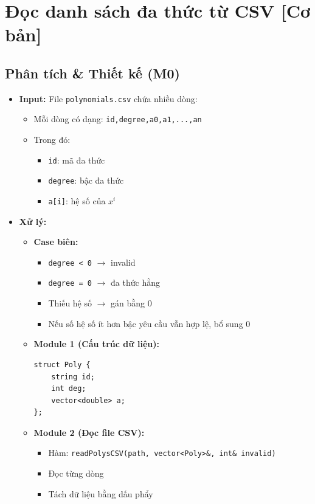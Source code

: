 \section{Đọc danh sách đa thức từ CSV [Cơ bản]}
\subsection{Phân tích \& Thiết kế (M0)}
\begin{itemize}
    \item \textbf{Input:}
    File \texttt{polynomials.csv} chứa nhiều dòng:
    \begin{itemize}
        \item Mỗi dòng có dạng:
        \texttt{id,degree,a0,a1,...,an}
        \item Trong đó:
        \begin{itemize}
            \item \texttt{id}: mã đa thức
            \item \texttt{degree}: bậc đa thức
            \item \texttt{a[i]}: hệ số của \(x^i\)
        \end{itemize}
    \end{itemize}

    \item \textbf{Xử lý:}
    \begin{itemize}
        \item \textbf{Case biên:}
        \begin{itemize}
            \item \texttt{degree < 0} $\rightarrow$ invalid
            \item \texttt{degree = 0} $\rightarrow$ đa thức hằng
            \item Thiếu hệ số $\rightarrow$ gán bằng 0
            \item Nếu số hệ số ít hơn bậc yêu cầu vẫn hợp lệ, bổ sung 0
        \end{itemize}

        \item \textbf{Module 1 (Cấu trúc dữ liệu):}
\begin{lstlisting}
struct Poly {
    string id;
    int deg;
    vector<double> a;
};
\end{lstlisting}

        \item \textbf{Module 2 (Đọc file CSV):}
        \begin{itemize}
            \item Hàm:
            \texttt{readPolysCSV(path, vector<Poly>\&, int\& invalid)}
            \item Đọc từng dòng
            \item Tách dữ liệu bằng dấu phẩy
        \end{itemize}


\end{itemize}
\end{itemize}
